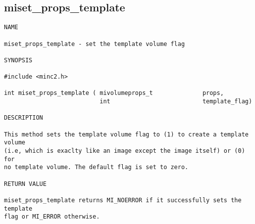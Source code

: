 \documentclass{article}
\begin{document}
\subsection{miset\_props\_template}
\begin{verbatim}
NAME

miset_props_template - set the template volume flag

SYNOPSIS

#include <minc2.h>

int miset_props_template ( mivolumeprops_t              props,
                           int                          template_flag)          

DESCRIPTION

This method sets the template volume flag to (1) to create a template volume
(i.e, which is exaclty like an image except the image itself) or (0) for
no template volume. The default flag is set to zero.

RETURN VALUE

miset_props_template returns MI_NOERROR if it successfully sets the template
flag or MI_ERROR otherwise.
\end{verbatim}






\end{document}
